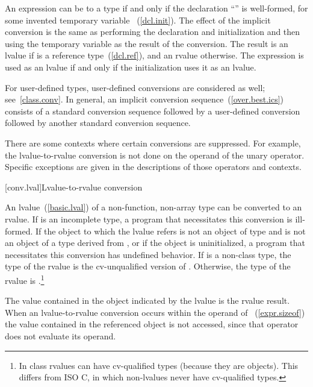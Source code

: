\pnum
An expression  can be
%
 to a type  if and only if the
declaration ``'' is well-formed, for some invented temporary
variable ~(\ref{dcl.init}). The effect of the implicit
conversion is the same as performing the declaration and initialization
and then using the temporary variable as the result of the conversion.
The result is an lvalue if  is a reference type~(\ref{dcl.ref}),
and an rvalue otherwise. The expression 
is used as an lvalue if and only if the initialization uses it as an lvalue.

\pnum
\enternote 
For user-defined types, user-defined conversions are considered as well;
see~\ref{class.conv}. In general, an implicit conversion
sequence~(\ref{over.best.ics}) consists of a standard conversion
sequence followed by a user-defined conversion followed by another
standard conversion sequence.

\pnum
There are some contexts where certain conversions are suppressed. For
example, the lvalue-to-rvalue conversion is not done on the operand of
the unary \tcode{\&} operator. Specific exceptions are given in the
descriptions of those operators and contexts.
\exitnote 

[conv.lval]{Lvalue-to-rvalue conversion}

\pnum
{}%
%
An lvalue~(\ref{basic.lval}) of a non-function, non-array type 
can be converted to an rvalue. If  is an incomplete type, a
program that necessitates this conversion is ill-formed. If the object
to which the lvalue refers is not an object of type  and is not
an object of a type derived from , or if the object is
uninitialized, a program that necessitates this conversion has undefined
behavior. If  is a non-class type, the type of the rvalue is
the cv-unqualified version of . Otherwise, the type of the
rvalue is .\footnote{In \Cpp class rvalues can have cv-qualified types (because they are
objects). This differs from ISO C, in which non-lvalues never have
cv-qualified types.}

\pnum
The value contained in the object indicated by the lvalue is the
rvalue result. When an lvalue-to-rvalue conversion occurs within the
operand of ~(\ref{expr.sizeof}) the value contained
in the referenced object is not accessed, since that operator does
not evaluate its operand.

